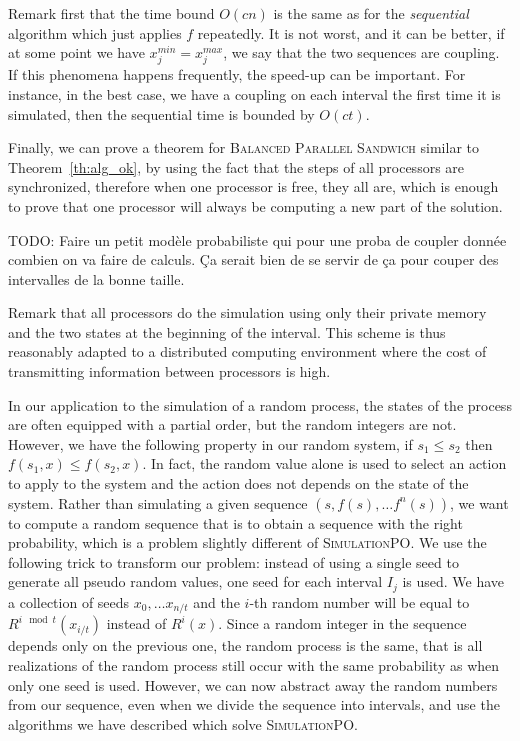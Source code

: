 \documentclass[a4paper,10pt]{article}
\newcommand{\todo}[1]{{\color{red} TODO: {#1}}}
\begin{document}
Remark first that the time bound $O(cn)$ is the same as for the \emph{sequential} algorithm which just applies
$f$ repeatedly. It is not worst, and it can be better, if at some point we have  $x_j^{min} = x_j^{max}$, we say that the 
two sequences are coupling. If this phenomena happens frequently, the speed-up can be important. 
For instance, in the best case, we have a coupling on each interval the first time it is simulated, then the sequential time is bounded by $O(ct)$.

Finally, we can prove a theorem for \textsc{Balanced Parallel Sandwich} similar to Theorem~\ref{th:alg_ok},
by using the fact that the steps of all processors are synchronized, therefore when one processor is free, they all are, which is enough to prove that one processor will always be computing a new part of the solution.

 \todo{Faire un petit modèle probabiliste qui pour une proba de coupler donnée combien on va faire de calculs.
 Ça serait bien de se servir de ça pour couper des intervalles de la bonne taille. }
 
Remark that all processors do the simulation using only their private memory and the two states at the beginning of the interval. This scheme is thus reasonably adapted to a distributed computing environment where the cost of transmitting information between processors is high. 

In our application to the simulation of a random process, the states of the process 
are often equipped with a partial order, but the random integers are not. 
However, we have the following property in our random system, if $s_1 \leq s_2$ then $f(s_1,x) \leq f(s_2,x)$. 
In fact, the random value alone is used to select an action to apply to the system and the action does not depends on the state of the system. Rather than simulating a given sequence $(s,f(s),\dots f^n(s))$, we want to compute a random sequence
that is to obtain a sequence with the right probability, which is a problem slightly different of \textsc{SimulationPO}.
We use the following trick to transform our problem: instead of using a single seed to generate all pseudo random values, one seed for each interval $I_j$ is used. We have a collection of seeds $x_0, \dots x_{n/t}$ and the $i$-th random number will be equal to $R^{i \mod t}(x_{i/t})$ instead of $R^i(x)$.
Since a random integer in the sequence depends only on the previous one, the random process is the same, that is  all realizations of the random process still occur with the same probability as when only one seed is used.
However, we can now abstract away the random numbers from our sequence, even when we divide the sequence into intervals, 
and use the algorithms we have described which solve \textsc{SimulationPO}.
\end{document}
